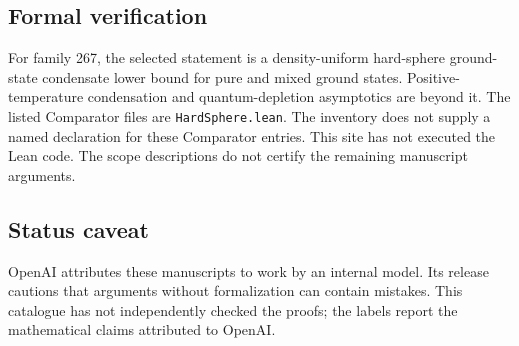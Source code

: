 \documentclass[11pt]{article}
\begin{document}
\subsection{Formal verification}
For family 267, the selected statement is a density-uniform hard-sphere ground-state condensate lower bound for pure and mixed ground states. Positive-temperature condensation and quantum-depletion asymptotics are beyond it. The listed Comparator files are \texttt{HardSphere.lean}. The inventory does not supply a named declaration for these Comparator entries. This site has not executed the Lean code. The scope descriptions do not certify the remaining manuscript arguments.

\subsection{Status caveat}
OpenAI attributes these manuscripts to work by an internal model. Its release cautions that arguments without formalization can contain mistakes. This catalogue has not independently checked the proofs; the labels report the mathematical claims attributed to OpenAI.
\end{document}
